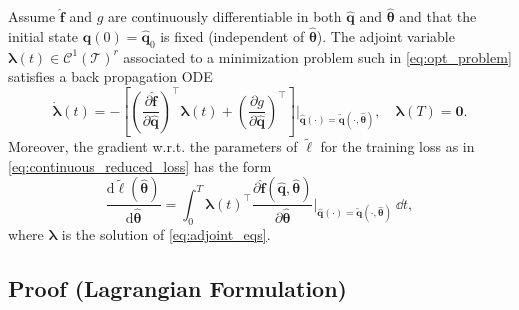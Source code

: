 \begin{theorem}
    \label{thm:adjoint_method}
    Assume $\hat{\mathbf{f}}$ and $g$ are continuously differentiable in both $\hat{\mathbf{q}}$ and $\hat{\bm{\theta}}$ and that the initial state $\hat{\mathbf{q}}(0)=\hat{\mathbf{q}}_0$ is fixed (independent of $\hat{\bm{\theta}}$). The adjoint variable $\bm{\lambda}(t)\in\mathcal{C}^1(\mathcal{T})^r$ associated to a minimization problem such in \eqref{eq:opt_problem} satisfies a back propagation ODE\\ 
    \begin{equation}
        \dot{\bm{\lambda}}(t) = -\left[ \left(\dfrac{\partial \hat{\mathbf{f}}}{\partial\hat{\mathbf{q}}}\right)^{\top}\bm{\lambda}(t) + \left( \dfrac{\partial g}{\partial \hat{\mathbf{q}}} \right)^{\top} \right]\Bigg\vert_{\hat{\mathbf{q}}(\cdot) = \tilde{\mathbf{q}}(\cdot, \hat{\bm{\theta}} ) },\quad\bm{\lambda}(T)=\bm{0}.
        \label{eq:adjoint_eqs}
    \end{equation}
    Moreover, the gradient w.r.t. the parameters of $\tilde\ell$ for the training loss as in \eqref{eq:continuous_reduced_loss} has the form\\
    \begin{equation}
        \frac{\mathrm{d}\tilde{\ell}(\hat{\bm{\theta}})}{\mathrm{d}\hat{\bm{\theta}}}
   = \int_0^T \bm{\lambda}(t)^{\top}\dfrac{\partial\hat{\mathbf{f}}(\hat{\mathbf{q}},\hat{\bm{\theta}})}{\partial\hat{\bm{\theta}}}\Bigg\vert_{\hat{\mathbf{q}}(\cdot) = \tilde{\mathbf{q}}(\cdot, \hat{\bm{\theta}} ) }~\dd t,
        \label{eq:gradient_lagrange}
    \end{equation}
    where $\bm{\lambda}$ is the solution of \eqref{eq:adjoint_eqs}.
\end{theorem}

\subsection*{Proof (Lagrangian Formulation)}

